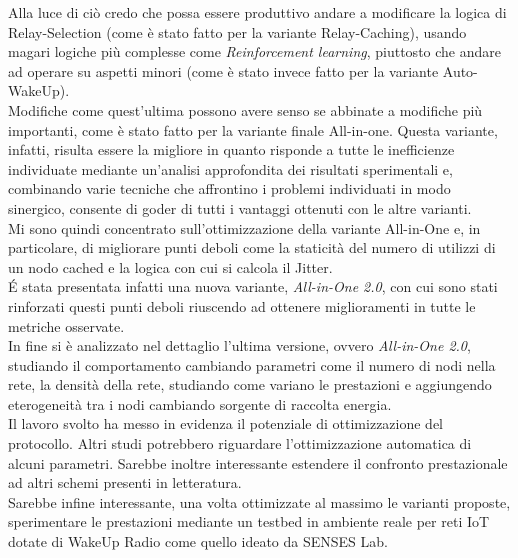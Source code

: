 Alla luce di ciò credo che possa essere produttivo andare a modificare la logica di Relay-Selection (come è stato fatto per la variante Relay-Caching), usando magari logiche più complesse come \textit{Reinforcement learning}, piuttosto che andare ad operare su aspetti minori (come è stato invece fatto per la variante Auto-WakeUp). \\
Modifiche come quest'ultima possono avere senso se abbinate a modifiche più importanti, come è stato fatto per la variante finale All-in-one. Questa variante, infatti, risulta essere la migliore in quanto risponde a tutte le inefficienze individuate mediante un'analisi approfondita dei risultati sperimentali e, combinando varie tecniche che affrontino i problemi individuati in modo sinergico, consente di goder di tutti i vantaggi ottenuti con le altre varianti.\\

Mi sono quindi concentrato sull'ottimizzazione della variante All-in-One e, in particolare, di migliorare punti deboli come la staticità del numero di utilizzi di un nodo cached e la logica con cui si calcola il Jitter.\\
\'E stata presentata infatti una nuova variante, \textit{All-in-One 2.0}, con cui sono stati rinforzati questi punti deboli riuscendo ad ottenere miglioramenti in tutte le metriche osservate.\\

In fine si è analizzato nel dettaglio l'ultima versione, ovvero \textit{All-in-One 2.0}, studiando il comportamento cambiando parametri come il numero di nodi nella rete, la densità della rete, studiando come variano le prestazioni e aggiungendo eterogeneità tra i nodi cambiando sorgente di raccolta energia.\\

Il lavoro svolto ha messo in evidenza il potenziale di ottimizzazione del protocollo. Altri studi potrebbero riguardare l'ottimizzazione automatica di alcuni parametri. Sarebbe inoltre interessante estendere il confronto prestazionale ad altri schemi presenti in letteratura.\\

Sarebbe infine interessante, una volta ottimizzate al massimo le varianti proposte, sperimentare le prestazioni mediante un testbed in ambiente reale per reti IoT dotate di WakeUp Radio come quello ideato da SENSES Lab.